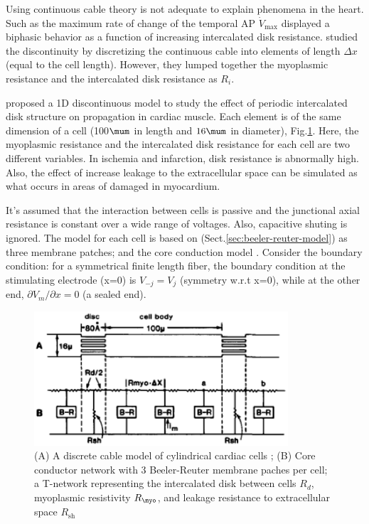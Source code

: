 Using continuous cable theory is not adequate to explain phenomena in the heart.
Such as the maximum rate of change of the temporal AP $\dot{V}_\max$ displayed a
biphasic behavior as a function of increasing intercalated disk resistance. 
\citep{joyner1982} studied the discontinuity by discretizing the continuous
cable into elements of length $\Delta x$ (equal to the cell length). However,
they lumped together the myoplasmic resistance and the intercalated disk
resistance as $R_i$.

\citep{rudy1987} proposed a 1D discontinuous model to study the effect of
periodic intercalated disk structure on propagation in cardiac muscle. Each
element is of the same dimension of a cell (100$\mum$ in length and $16\mum$ in
diameter), Fig.\ref{fig:cablemodel_Rudy1987}. Here, the myoplasmic resistance
and the intercalated disk resistance for each cell are two different variables.
In ischemia and infarction, disk resistance is abnormally high. Also, the
effect of increase leakage to the extracellular space can be simulated as what
occurs in areas of damaged in myocardium.

It's assumed that the interaction between cells is passive and the junctional
axial resistance is constant over a wide range of voltages. Also, capacitive
shuting is ignored. The model for each cell is based on \citep{beeler1977rap}
(Sect.\ref{sec:beeler-reuter-model}) as three membrane patches; and the core
conduction model \citep{hodgkin1946ecc}. Consider the boundary condition: for a
symmetrical finite length fiber, the boundary condition at the stimulating
electrode (x=0) is $V_{-j}=V_{j}$ (symmetry w.r.t x=0), while at the other end,
$\partial V_m/\partial x=0$ (a sealed end).

\begin{figure}[hbt]
  \centerline{\includegraphics[height=5cm]{./images/Cablemodel_Rudy1987.eps}}
\caption{(A) A discrete cable model of cylindrical cardiac cells
\citep{rudy1987}; (B) Core conductor network with 3 Beeler-Reuter membrane
paches per cell; a T-network representing the intercalated disk between cells
$R_d$, myoplasmic resistivity $R_\myo$, and leakage resistance to extracellular
space $R_\text{sh}$}
\label{fig:cablemodel_Rudy1987}
\end{figure}




